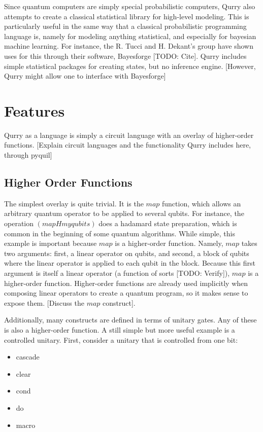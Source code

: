 \documentclass[journal]{IEEEtran}
\begin{document}
Since quantum computers are simply special probabilistic computers, Qurry also attempts to create a classical statistical library for high-level modeling. 
This is particularly useful in the same way that a classical probabilistic programming language is, namely for modeling anything statistical, and especially for bayesian machine learning.
For instance, the R. Tucci and H. Dekant's group have shown uses for this through their software, Bayesforge [TODO: Cite].
Qurry includes simple statistical packages for creating states, but no inference engine.
[However, Qurry might allow one to interface with Bayesforge]

\section{Features}

    Qurry as a language is simply a circuit language with an overlay of higher-order functions.
    [Explain circuit languages and the functionality Qurry includes here, through pyquil]

    \subsection{Higher Order Functions}

    The simplest overlay is quite trivial. It is the $map$ function, which allows an arbitrary quantum operator to be applied to several qubits. 
    For instance, the operation $(map H myqubits)$ does a hadamard state preparation, which is common in the beginning of some quantum algorithms.
    While simple, this example is important because $map$ is a higher-order function.
    Namely, $map$ takes two arguments: first, a linear operator on qubits, and second, a block of qubits where the linear operator is applied to each qubit in the block.
    Because this first argument is itself a linear operator (a function of sorts [TODO: Verify]), $map$ is a higher-order function.
    Higher-order functions are already used implicitly when composing linear operators to create a quantum program, so it makes sense to expose them.
    [Discuss the $map$ construct].

    Additionally, many constructs are defined in terms of unitary gates. Any of these is also a higher-order function.
    A still simple but more useful example is a controlled unitary.
    First, consider a unitary that is controlled from one bit:


    \begin{itemize}
        \item cascade 	    
        \item clear 	    
        \item cond 	    
        \item do 	        
        \item macro 	    
    \end{itemize}
\end{document}
